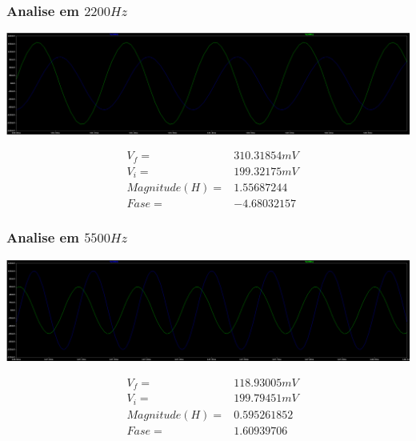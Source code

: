\documentclass[12pt,twoside, a4paper, twocolumn]{article}
\begin{document}
\subsubsection{Analise em $2200Hz$}


\begin{adjustbox}{scale=0.09}
    \includegraphics{ltfreq2200.png}
\end{adjustbox}


\begin{equation*}
    \begin{aligned}
         & V_f =          & 310.31854mV \\
         & V_i =          & 199.32175mV \\
         & Magnitude(H) = & 1.55687244  \\
         & Fase =         & -4.68032157
    \end{aligned}
\end{equation*}


\subsubsection{Analise em $5500Hz$}


\begin{adjustbox}{scale=0.09}
    \includegraphics{ltfreq5500.png}
\end{adjustbox}


\begin{equation*}
    \begin{aligned}
         & V_f =          & 118.93005mV \\
         & V_i =          & 199.79451mV \\
         & Magnitude(H) = & 0.595261852 \\
         & Fase =         & 1.60939706
    \end{aligned}
\end{equation*}
\end{document}
